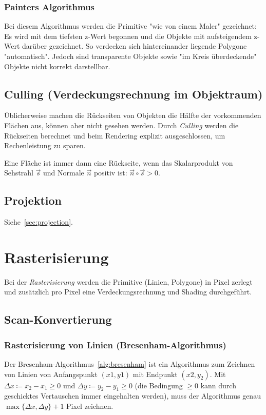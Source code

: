 			\subsubsection{Painters Algorithmus}
				Bei diesem Algorithmus werden die Primitive "wie von einem Maler" gezeichnet: Es wird mit dem tiefsten z-Wert begonnen und die Objekte mit aufsteigendem z-Wert darüber gezeichnet. So verdecken sich hintereinander liegende Polygone "automatisch". Jedoch sind transparente Objekte sowie "im Kreis überdeckende" Objekte nicht korrekt darstellbar.

		\subsection{Culling (Verdeckungsrechnung im Objektraum)}
			Üblicherweise machen die Rückseiten von Objekten \ca die Hälfte der vorkommenden Flächen aus, können aber nicht gesehen werden. Durch \emph{Culling} werden die Rückseiten berechnet und beim Rendering explizit ausgeschlossen, um Rechenleistung zu sparen.
			
			Eine Fläche ist immer dann eine Rückseite, wenn das Skalarprodukt von Sehstrahl \( \vec{s} \) und Normale \( \vec{n} \) positiv ist: \( \vec{n} \circ \vec{s} > 0 \).

		\subsection{Projektion}
			Siehe~\ref{sec:projection}.

	\section{Rasterisierung}
		Bei der \emph{Rasterisierung} werden die Primitive (Linien, Polygone) in Pixel zerlegt und zusätzlich pro Pixel eine Verdeckungsrechnung und Shading durchgeführt.

		\subsection{Scan-Konvertierung}
			\subsubsection{Rasterisierung von Linien (Bresenham-Algorithmus)}
			Der Bresenham-Algorithmus~\ref{alg:bresenham} ist ein Algorithmus zum Zeichnen von Linien von Anfangspunkt \( (x1, y1) \) mit Endpunkt \( (x2, y_2) \). Mit \( \Delta x \coloneqq x_2 - x_1 \geq 0 \) und \( \Delta y \coloneqq y_2 - y_1 \geq 0 \) (die Bedingung \( \geq 0 \) kann durch geschicktes Vertauschen immer eingehalten werden), muss der Algorithmus genau \( \max \big\{ \Delta x, \Delta y \big\} + 1 \) Pixel zeichnen.
				
